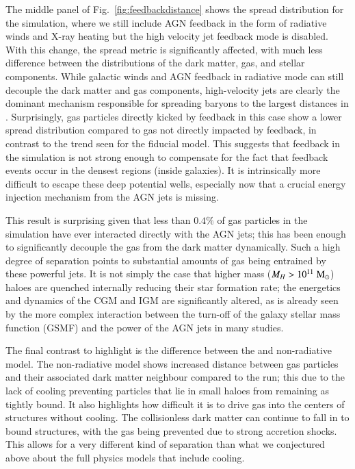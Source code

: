 The middle panel of Fig.~\ref{fig:feedbackdistance} shows the spread
distribution for the \nojet{} simulation, where we still include AGN feedback
in the form of radiative winds and X-ray heating but the high velocity jet
feedback mode is disabled. With this change, the spread metric is
significantly affected, with much less difference between the distributions
of the dark matter, gas, and stellar components. While galactic winds and AGN
feedback in radiative mode can still decouple the dark matter and gas
components, high-velocity jets are clearly the dominant mechanism responsible
for spreading baryons to the largest distances in \simba{}. Surprisingly, gas
particles directly kicked by feedback in this case show a lower spread
distribution compared to gas not directly impacted by feedback, in contrast
to the trend seen for the fiducial \simba{} model. This suggests that
feedback in the \nojet{} simulation is not strong enough to compensate for the
fact that feedback events occur in the densest regions (inside galaxies). It is
intrinsically more difficult to escape these deep potential wells, especially
now that a crucial energy injection mechanism from the AGN jets is missing.

This result is surprising given that less than $0.4\%$ of gas particles in
the simulation have ever interacted directly with the AGN jets; this has been
enough to significantly decouple the gas from the dark matter dynamically.
Such a high degree of separation points to substantial amounts of gas being
entrained by these powerful jets. It is not simply the case that higher mass
($M_H > 10^{11} \;{\rm M}_{\odot}{}$) haloes are quenched internally reducing their star
formation rate; the energetics and dynamics of the CGM and IGM are
significantly altered, as is already seen by the more complex interaction
between the turn-off of the galaxy stellar mass function (GSMF) and the power
of the AGN jets in many studies. 

The final contrast to highlight is the difference between the \nojet{} and
non-radiative model. The non-radiative model shows increased distance between
gas particles and their associated dark matter neighbour compared to the
\nojet{} run; this due to the lack of cooling preventing particles that lie
in small haloes from remaining as tightly bound. It also highlights how
difficult it is to drive gas into the centers of structures without cooling.
The collisionless dark matter can continue to fall in to bound structures,
with the gas being prevented due to strong accretion shocks. This allows for
a very different kind of separation than what we conjectured above about the
full physics models that include cooling.

